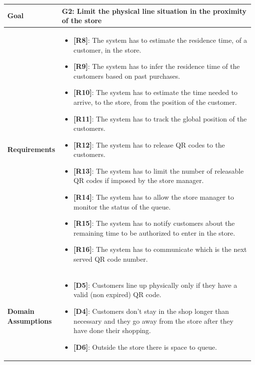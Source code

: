 \begin{table}[H]
\centering
\begin{tabular}{| m{} | m{} |} 
	\hline
	\textbf{Goal} &
		\textbf{G2: Limit the physical line situation in the proximity of the store} \\
	\hline
	\textbf{Requirements} &
		\begin{itemize}
			\item {\textbf{[R8]}}: The system has to estimate the residence time, of a customer, in the store.
			\item {\textbf{[R9]}}: The system has to infer the residence time of the customers based on past purchases.
			\item {\textbf{[R10]}}: The system has to estimate the time needed to arrive, to the store, from the position of the customer.
			\item {\textbf{[R11]}}: The system has to track the global position of the customers.
			\item {\textbf{[R12]}}: The system has to release QR codes to the customers.
			\item {\textbf{[R13]}}: The system has to limit the number of releasable QR codes if imposed by the store manager.
			\item {\textbf{[R14]}}: The system has to allow the store manager to monitor the status of the queue.
			\item {\textbf{[R15]}}: The system has to notify customers about the remaining time to be authorized to enter in the store.
			\item {\textbf{[R16]}}: The system has to communicate which is the next served QR code number.
		\end{itemize} \\ 
	\hline
	\shortstack[l]{\textbf{Domain} \\ \textbf{Assumptions}} & 
		\begin{itemize}
			\item {\textbf{[D5]}}: Customers line up physically only if they have a valid (non expired) QR code.
			\item {\textbf{[D4]}}: Customers don't stay in the shop longer than necessary and they go away from the store after they have done their shopping.
			\item {\textbf{[D6]}}: Outside the store there is space to queue.
		\end{itemize} \\ 
	\hline
\end{tabular}
\end{table}

